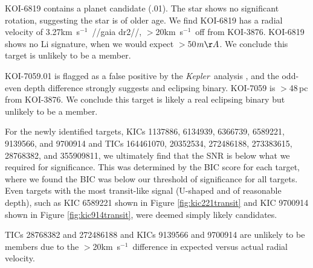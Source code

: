 \documentclass[twocolumn]{aastex631}
\newcommand{\starname}{KOI-3876}
\newcommand{\kepler}{{\it Kepler}}
\newcommand\kms{km~s$^{-1}$}
\newcommand{\gaia}{{\textit Gaia}}
\begin{document}




KOI-6819 contains a planet candidate (.01). The star shows no significant rotation, suggesting the star is of older age. We find KOI-6819 has a radial velocity of 3.27\kms\ //gaia dr2//, $>$20\kms\ off from \starname. KOI-6819 shows no Li signature, when we would expect $>$50$m\AA$. We conclude this target is unlikely to be a member. 

KOI-7059.01 is flagged as a false positive by the \kepler\ analysis \citep{2016ApJS..224...12C}, and the odd-even depth difference strongly suggests and eclipsing binary. KOI-7059 is $>$48\,pc from \starname. We conclude this target is likely a real eclipsing binary but unlikely to be a member.

For the newly identified targets, KICs 1137886, 6134939, 6366739, 6589221, 9139566, and 9700914 and TICs 164461070, 20352534, 272486188, 273383615, 28768382, and 355909811, we ultimately find that the SNR is below what we required for significance. This was determined by the BIC score for each target, where we found the BIC was below our threshold of significance for all targets. Even targets with the most transit-like signal (U-shaped and of reasonable depth), such as KIC 6589221 shown in Figure \ref{fig:kic221transit} and KIC 9700914 shown in Figure \ref{fig:kic914transit}, were deemed simply likely candidates. 

TICs 28768382 and 272486188 and KICs 9139566 and 9700914 are unlikely to be members due to the $>$20\kms\ difference in expected versus actual radial velocity. %
\end{document}
